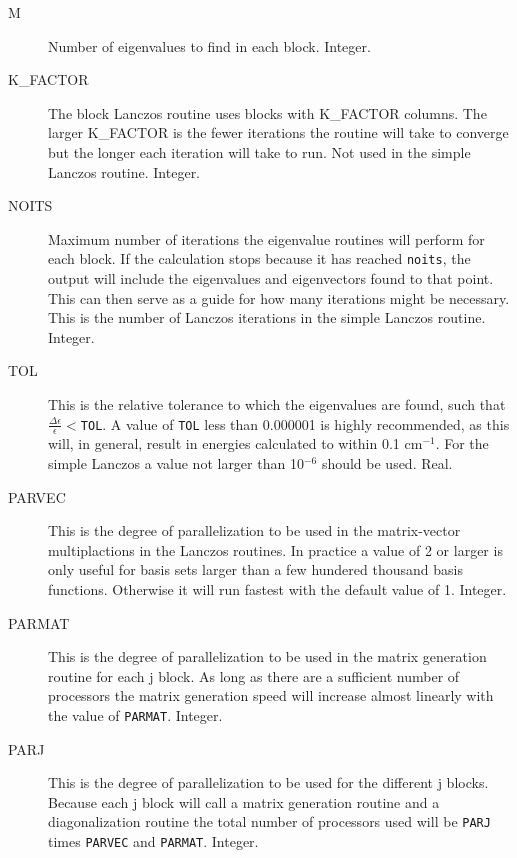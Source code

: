 \documentclass{article}
\newcommand{\wn}{cm$^{-1}$}
\begin{document}
\begin{description}
\item[M] Number of eigenvalues to find in each block. Integer.

\item[K\_FACTOR] The block Lanczos routine uses blocks with 
  K\_FACTOR columns. The larger K\_FACTOR is the fewer iterations
  the routine will take to converge but the longer each iteration
  will take to run. Not used in the simple Lanczos routine. Integer.

\item[NOITS] Maximum number of iterations the eigenvalue routines
  will perform for each block. If the calculation stops because it has
  reached {\tt noits}, the output will include the eigenvalues and
  eigenvectors found to that point. This can then serve as a guide for
  how many iterations might be necessary. This is the number of Lanczos
  iterations in the simple Lanczos routine. Integer.

\item[TOL] This is the relative tolerance to which
  the eigenvalues are found, such that $\frac{\Delta \epsilon
    }{\epsilon } < ${\tt TOL}. A value of {\tt TOL} less than 0.000001 is highly
  recommended, as this will, in general, result in energies calculated
  to within 0.1 \wn . For the simple Lanczos a value not larger than 10$^{-6}$
  should be used. Real.
  
\item[PARVEC] This is the degree of parallelization to be used in
  the matrix-vector multiplactions in the Lanczos routines. In 
  practice a value of 2 or larger is only useful for basis sets larger than
  a few hundered thousand basis functions. Otherwise it will run
  fastest with the default value of 1. Integer.

\item[PARMAT] This is the degree of parallelization to be used in
  the matrix generation routine for each j block. As long as there are
  a sufficient number of processors the matrix generation speed 
  will increase almost linearly with the value of {\tt PARMAT}. Integer.

\item[PARJ] This is the degree of parallelization to be used for
  the different j blocks.  Because each j block will call a matrix
  generation routine and a diagonalization routine the total number
  of processors used will be {\tt PARJ} times {\tt PARVEC} and {\tt PARMAT}. Integer.


\end{description}
\end{document}
